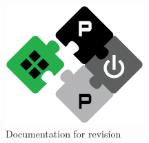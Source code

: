 \includegraphics[width=.3\textwidth]{../pulp_logo.png}\\
\vspace*{1cm}
{\large Documentation for revision\\\texttt{}}\\
\vspace*{2cm}
